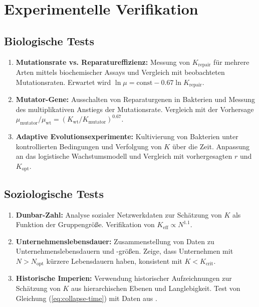 \documentclass[12pt,a4paper]{article}
\theoremstyle{remark}
\newcommand{\Keff}{K_{\mathrm{eff}}}
\begin{document}
	\section{Experimentelle Verifikation}
	\label{sec:experiments}
	
	\subsection{Biologische Tests}
	
	\begin{enumerate}
		\item \textbf{Mutationsrate vs. Reparatureffizienz:} Messung von $K_{\text{repair}}$ für mehrere Arten mittels biochemischer Assays und Vergleich mit beobachteten Mutationsraten. Erwartet wird $\ln \mu = \text{const} - 0.67 \ln K_{\text{repair}}$.
		\item \textbf{Mutator-Gene:} Ausschalten von Reparaturgenen in Bakterien und Messung des multiplikativen Anstiegs der Mutationsrate. Vergleich mit der Vorhersage $\mu_{\text{mutator}}/\mu_{\text{wt}} = (K_{\text{wt}}/K_{\text{mutator}})^{0.67}$.
		\item \textbf{Adaptive Evolutionsexperimente:} Kultivierung von Bakterien unter kontrollierten Bedingungen und Verfolgung von $K$ über die Zeit. Anpassung an das logistische Wachstumsmodell und Vergleich mit vorhergesagten $r$ und $K_{\text{opt}}$.
	\end{enumerate}
	
	\subsection{Soziologische Tests}
	
	\begin{enumerate}
		\item \textbf{Dunbar-Zahl:} Analyse sozialer Netzwerkdaten zur Schätzung von $K$ als Funktion der Gruppengröße. Verifikation von $\Keff \propto N^{1.1}$.
		\item \textbf{Unternehmenslebensdauer:} Zusammenstellung von Daten zu Unternehmenslebensdauern und -größen. Zeige, dass Unternehmen mit $N > N_{\text{opt}}$ kürzere Lebensdauern haben, konsistent mit $K < K_{\text{crit}}$.
		\item \textbf{Historische Imperien:} Verwendung historischer Aufzeichnungen zur Schätzung von $K$ aus hierarchischen Ebenen und Langlebigkeit. Test von Gleichung (\ref{eq:collapse-time}) mit Daten aus \cite{TurchinNefedov2009}.
	\end{enumerate}
	
\end{document}
